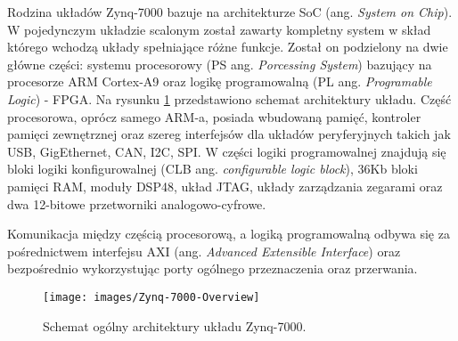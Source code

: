 Rodzina układów Zynq-7000 bazuje na architekturze SoC (ang. \textit{System on Chip}). W pojedynczym układzie scalonym został zawarty kompletny system w skład którego wchodzą układy spełniające różne funkcje. Został on podzielony na dwie główne części: systemu procesorowy (PS ang. \textit{Porcessing System}) bazujący na procesorze ARM Cortex-A9 oraz logikę programowalną (PL ang. \textit{Programable Logic}) - FPGA. %
Na rysunku \ref{fig:zynq7000} przedstawiono schemat architektury układu. %
Część procesorowa, oprócz samego ARM-a, posiada wbudowaną pamięć, kontroler pamięci zewnętrznej oraz szereg interfejsów dla układów peryferyjnych takich jak USB, GigEthernet, CAN, I2C, SPI. %
W części logiki programowalnej znajdują się bloki logiki konfigurowalnej (CLB ang. \textit{configurable logic block}), 36Kb bloki pamięci RAM, moduły DSP48, układ JTAG, układy zarządzania zegarami oraz dwa 12-bitowe przetworniki analogowo-cyfrowe.

Komunikacja między częścią procesorową, a logiką programowalną odbywa się za pośrednictwem interfejsu AXI (ang. \textit{Advanced Extensible Interface}) oraz bezpośrednio wykorzystując porty ogólnego przeznaczenia oraz przerwania.

\begin{figure}[h]
    \centering
    \texttt{[image: images/Zynq-7000-Overview]}
    \caption{Schemat ogólny architektury układu Zynq-7000.}
    \label{fig:zynq7000}
\end{figure}

